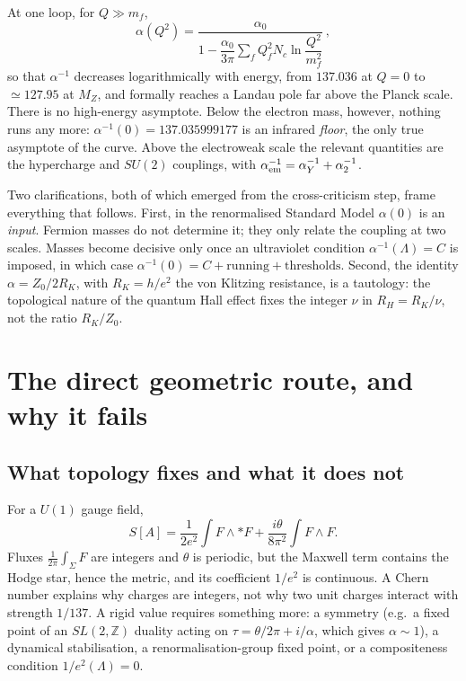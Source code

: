 \documentclass[11pt,a4paper]{article}
\newcommand{\ainv}{\alpha^{-1}}
\begin{document}
At one loop, for $Q\gg m_f$,
\begin{equation}
\alpha(Q^2)=\frac{\alpha_0}{1-\dfrac{\alpha_0}{3\pi}\sum_f Q_f^2N_c\ln\dfrac{Q^2}{m_f^2}}\,,
\end{equation}
so that $\ainv$ decreases logarithmically with energy, from $137.036$ at $Q=0$ to $\simeq127.95$ at $M_Z$, and formally
reaches a Landau pole far above the Planck scale. There is no high-energy asymptote. Below the electron mass, however,
nothing runs any more: $\ainv(0)=137.035999177$ \cite{CODATA} is an infrared \emph{floor}, the only true asymptote of the
curve. Above the electroweak scale the relevant quantities are the hypercharge and $SU(2)$ couplings, with
$\ainv_{\rm em}=\ainv_Y+\ainv_2$.

Two clarifications, both of which emerged from the cross-criticism step, frame everything that follows.
First, in the renormalised Standard Model $\alpha(0)$ is an \emph{input}. Fermion masses do not determine it; they only
relate the coupling at two scales. Masses become decisive only once an ultraviolet condition
$\ainv(\Lambda)=C$ is imposed, in which case $\ainv(0)=C+\text{running}+\text{thresholds}$.
Second, the identity $\alpha=Z_0/2R_K$, with $R_K=h/e^2$ the von Klitzing resistance, is a tautology: the topological
nature of the quantum Hall effect fixes the integer $\nu$ in $R_H=R_K/\nu$, not the ratio $R_K/Z_0$.

\section{The direct geometric route, and why it fails}

\subsection{What topology fixes and what it does not}
For a $U(1)$ gauge field,
\begin{equation}
S[A]=\frac{1}{2e^2}\int F\wedge{*F}+\frac{i\theta}{8\pi^2}\int F\wedge F .
\end{equation}
Fluxes $\frac{1}{2\pi}\int_\Sigma F$ are integers and $\theta$ is periodic, but the Maxwell term contains the Hodge star,
hence the metric, and its coefficient $1/e^2$ is continuous. A Chern number explains why charges are integers, not why two
unit charges interact with strength $1/137$. A rigid value requires something more: a symmetry (e.g.\ a fixed point of
an $SL(2,\mathbb Z)$ duality acting on $\tau=\theta/2\pi+i/\alpha$, which gives $\alpha\sim1$), a dynamical stabilisation,
a renormalisation-group fixed point, or a compositeness condition $1/e^2(\Lambda)=0$.
\end{document}
